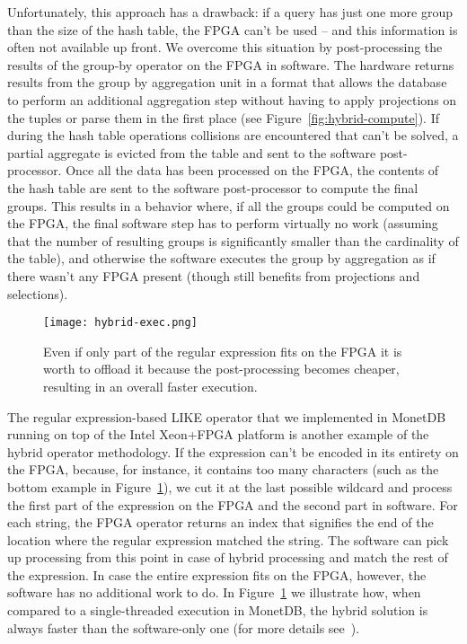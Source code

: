 \documentclass[11pt]{article}
\begin{document}
Unfortunately, this approach has a drawback: if a query has just one more group than the size of the hash table, the FPGA can't be used -- and this information is often not available up front. We overcome this situation by post-processing the results of the group-by operator on the FPGA in software. The hardware returns results from the group by aggregation unit in a format that allows the database to perform an additional aggregation step without having to apply projections on the tuples or parse them in the first place (see Figure~\ref{fig:hybrid-compute}). If during the hash table operations collisions are encountered that can't be solved, a partial aggregate is evicted from the table and sent to the software post-processor. Once all the data has been processed on the FPGA, the contents of the hash table are sent to the software post-processor to compute the final groups. This results in a behavior where, if all the groups could be computed on the FPGA, the final software step has to perform virtually no work (assuming that the number of resulting groups is significantly smaller than the cardinality of the table), and otherwise the software executes the group by aggregation as if there wasn't any FPGA present (though still benefits from projections and selections).



\begin{figure}[t]
\centering
\texttt{[image: hybrid-exec.png]}
\caption{Even if only part of the regular expression fits on the FPGA it is worth to offload it because the post-processing becomes cheaper, resulting in an overall faster execution.\label{fig:hybrid-regex}}
\end{figure}

The regular expression-based LIKE operator that we implemented in MonetDB~\cite{sidler-regex-sigmod17} running on top of the Intel Xeon+FPGA platform is another example of the hybrid operator methodology. If the expression can't be encoded in its entirety on the FPGA, because, for instance, it contains too many characters (such as the bottom example in Figure~\ref{fig:hybrid-regex}), we cut it at the last possible wildcard and process the first part of the expression on the FPGA and the second part in software. For each string, the FPGA operator returns an index that signifies the end of the location where the regular expression matched the string. The software can pick up processing from this point in case of hybrid processing and match the rest of the expression. In case the entire expression fits on the FPGA, however, the software has no additional work to do. In Figure~\ref{fig:hybrid-regex} we illustrate how, when compared to a single-threaded execution in MonetDB, the hybrid solution is always faster than the software-only one (for more details see~\cite{sidler-regex-sigmod17}). 
\end{document}

